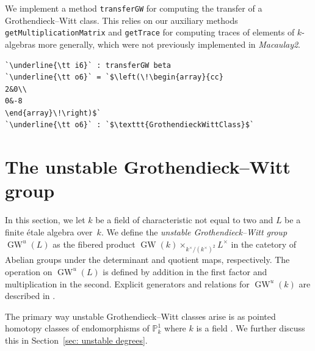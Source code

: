 \documentclass[12pt]{amsart}
\theoremstyle{definition}
\DeclareMathOperator{\GW}{GW}
\begin{document}
We implement a method \texttt{transferGW} for computing the transfer of a Grothendieck--Witt class. This relies on our auxiliary methods \texttt{getMultiplicationMatrix} and \texttt{getTrace} for computing traces of elements of $k$-algebras more generally, which were not previously implemented in \emph{Macaulay2}. 
\begin{lstlisting}[language=Macaulay2output]
`\underline{\tt i6}` : transferGW beta
`\underline{\tt o6}` = `$\left(\!\begin{array}{cc}
2&0\\
0&-8
\end{array}\!\right)$`
`\underline{\tt o6}` : `$\texttt{GrothendieckWittClass}$`
\end{lstlisting}

\section{The unstable Grothendieck--Witt group}\label{sec: unstable group}

In this section, we let $k$ be a field of characteristic not equal to two and $L$ be a finite \'{e}tale algebra over~$k$. We define the \emph{unstable Grothendieck--Witt group} $\GW^{u}(L)$ as the fibered product $\GW(k)\times_{k^{\times}/(k^{\times})^{2}}L^{\times}$ in the catetory of Abelian groups under the determinant and quotient maps, respectively. The operation on $\GW^{u}(L)$ is defined by addition in the first factor and multiplication in the second. Explicit generators and relations for $\GW^{u}(k)$ are described in \cite[Proposition~2.3]{IMSTW}.

The primary way unstable Grothendieck--Witt classes arise is as pointed homotopy classes of endomorphisms of $\mathbb{P}^{1}_{k}$ where $k$ is a field \cite[Theorem~3.6]{Cazanave}.  We further discuss this in Section~\ref{sec: unstable degrees}.
\end{document}
